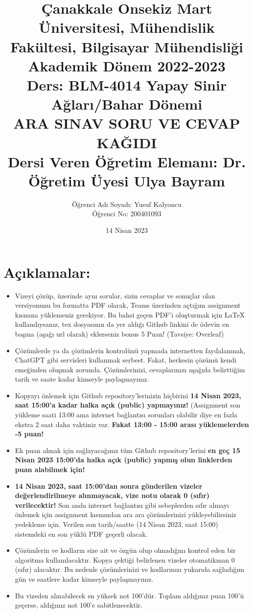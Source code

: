 \documentclass[11pt]{article}
\title{Çanakkale Onsekiz Mart Üniversitesi, Mühendislik Fakültesi, Bilgisayar Mühendisliği Akademik Dönem 2022-2023\\
Ders: BLM-4014 Yapay Sinir Ağları/Bahar Dönemi\\ 
ARA SINAV SORU VE CEVAP KAĞIDI\\
Dersi Veren Öğretim Elemanı: Dr. Öğretim Üyesi Ulya Bayram}
\author{%
\begin{minipage}{\textwidth}
\raggedright
Öğrenci Adı Soyadı: Yusuf Kalyoncu\\ %
Öğrenci No: 200401093
\end{minipage}%
}
\date{14 Nisan 2023}
\begin{document}
\maketitle

\vspace{-.5in}
\section*{Açıklamalar:}
\begin{itemize}
    \item Vizeyi çözüp, üzerinde aynı sorular, sizin cevaplar ve sonuçlar olan versiyonunu bu formatta PDF olarak, Teams üzerinden açtığım assignment kısmına yüklemeniz gerekiyor. Bu bahsi geçen PDF'i oluşturmak için LaTeX kullandıysanız, tex dosyasının da yer aldığı Github linkini de ödevin en başına (aşağı url olarak) eklerseniz bonus 5 Puan! (Tavsiye: Overleaf)
    \item Çözümlerde ya da çözümlerin kontrolünü yapmada internetten faydalanmak, ChatGPT gibi servisleri kullanmak serbest. Fakat, herkesin çözümü kendi emeğinden oluşmak zorunda. Çözümlerinizi, cevaplarınızı aşağıda belirttiğim tarih ve saate kadar kimseyle paylaşmayınız. 
    \item Kopyayı önlemek için Github repository'lerinizin hiçbirini \textbf{14 Nisan 2023, saat 15:00'a kadar halka açık (public) yapmayınız!} (Assignment son yükleme saati 13:00 ama internet bağlantısı sorunları olabilir diye en fazla ekstra 2 saat daha vaktiniz var. \textbf{Fakat 13:00 - 15:00 arası yüklemelerden -5 puan!}
    \item Ek puan almak için sağlayacağınız tüm Github repository'lerini \textbf{en geç 15 Nisan 2023 15:00'da halka açık (public) yapmış olun linklerden puan alabilmek için!}
    \item \textbf{14 Nisan 2023, saat 15:00'dan sonra gönderilen vizeler değerlendirilmeye alınmayacak, vize notu olarak 0 (sıfır) verilecektir!} Son anda internet bağlantısı gibi sebeplerden sıfır almayı önlemek için assignment kısmından ara ara çözümlerinizi yükleyebilirsiniz yedekleme için. Verilen son tarih/saatte (14 Nisan 2023, saat 15:00) sistemdeki en son yüklü PDF geçerli olacak.
    \item Çözümlerin ve kodların size ait ve özgün olup olmadığını kontrol eden bir algoritma kullanılacaktır. Kopya çektiği belirlenen vizeler otomatikman 0 (sıfır) alacaktır. Bu nedenle çözümlerinizi ve kodlarınızı yukarıda sağladığım gün ve saatlere kadar kimseyle paylaşmayınız.
    \item Bu vizeden alınabilecek en yüksek not 100'dür. Toplam aldığınız puan 100'ü geçerse, aldığınız not 100'e sabitlenecektir.

\end{itemize}
\end{document}
